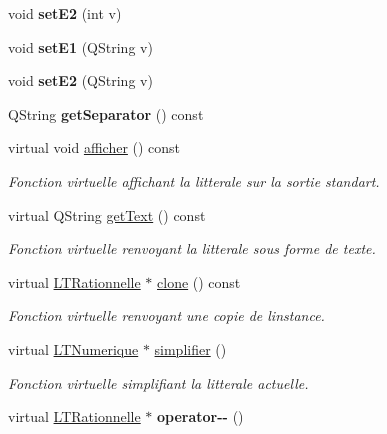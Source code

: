 \begin{DoxyCompactItemize}
\item 
void {\bfseries set\+E2} (int v)\hypertarget{class_l_t_rationnelle_a07f9a5a2c84b036a34a90634fbb886e4}{}\label{class_l_t_rationnelle_a07f9a5a2c84b036a34a90634fbb886e4}

\item 
void {\bfseries set\+E1} (Q\+String v)\hypertarget{class_l_t_rationnelle_a44b8d833c4cacecef2ebb74ff98b408b}{}\label{class_l_t_rationnelle_a44b8d833c4cacecef2ebb74ff98b408b}

\item 
void {\bfseries set\+E2} (Q\+String v)\hypertarget{class_l_t_rationnelle_a0bcf0dccc893e5039ed5a702150b5e07}{}\label{class_l_t_rationnelle_a0bcf0dccc893e5039ed5a702150b5e07}

\item 
Q\+String {\bfseries get\+Separator} () const \hypertarget{class_l_t_rationnelle_a7a29c24022807ab7cba1513ac3ff085c}{}\label{class_l_t_rationnelle_a7a29c24022807ab7cba1513ac3ff085c}

\item 
virtual void \hyperlink{class_l_t_rationnelle_ab77a7d22c9b666207722cd389e4d37a0}{afficher} () const \hypertarget{class_l_t_rationnelle_ab77a7d22c9b666207722cd389e4d37a0}{}\label{class_l_t_rationnelle_ab77a7d22c9b666207722cd389e4d37a0}

\begin{DoxyCompactList}\small\item\em Fonction virtuelle affichant la litterale sur la sortie standart. \end{DoxyCompactList}\item 
virtual Q\+String \hyperlink{class_l_t_rationnelle_a7195f7e7ddfe6c5493932fe08785ac76}{get\+Text} () const 
\begin{DoxyCompactList}\small\item\em Fonction virtuelle renvoyant la litterale sous forme de texte. \end{DoxyCompactList}\item 
virtual \hyperlink{class_l_t_rationnelle}{L\+T\+Rationnelle} $\ast$ \hyperlink{class_l_t_rationnelle_a48b36c50460ce15674d1d72afb41daf3}{clone} () const 
\begin{DoxyCompactList}\small\item\em Fonction virtuelle renvoyant une copie de l\textquotesingle{}instance. \end{DoxyCompactList}\item 
virtual \hyperlink{class_l_t_numerique}{L\+T\+Numerique} $\ast$ \hyperlink{class_l_t_rationnelle_afefcccb71e7fd20491e8f14aef88dd6e}{simplifier} ()
\begin{DoxyCompactList}\small\item\em Fonction virtuelle simplifiant la litterale actuelle. \end{DoxyCompactList}\item 
virtual \hyperlink{class_l_t_rationnelle}{L\+T\+Rationnelle} $\ast$ {\bfseries operator-\/-\/} ()\hypertarget{class_l_t_rationnelle_a73e30e2242e48cc7c721b10e6654a5bb}{}\label{class_l_t_rationnelle_a73e30e2242e48cc7c721b10e6654a5bb}


\end{DoxyCompactItemize}
